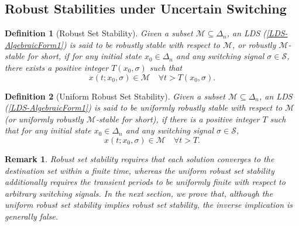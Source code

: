 \documentclass[11pt,onecolumn]{article}
\newtheorem{remark}{Remark}
\newtheorem{definition}{Definition}
\begin{document}
\subsection{Robust Stabilities under Uncertain Switching}





\begin{definition}[Robust Set Stability]\label{Definition3}
   Given a subset $\mathcal M\subseteq\Delta_{n}$, an LDS (\ref{LDS-AlgebraicForm1}) is said to be robustly stable with respect to $\mathcal M$, or robustly $\mathcal M$-stable for short, if for any initial state $x_0\in\Delta_n$ and any switching signal $\sigma\in\mathcal S$, there exists a positive integer $T(x_0,\sigma)$ such that
   \[x(t;x_0,\sigma)\in\mathcal M\quad\forall t> T(x_0,\sigma).\]

   \end{definition}

   \begin{definition}[Uniform Robust Set Stability]\label{DefinitionURSS}
   Given a subset $\mathcal M\subseteq\Delta_n$, an LDS (\ref{LDS-AlgebraicForm1}) is said to be uniformly robustly stable with respect to $\mathcal M$ (or uniformly robustly $\mathcal M$-stable for short), if there is a positive integer $T$ such that for any initial state $ x_0\in\Delta_n$ and any switching signal $\sigma\in\mathcal S$,
   \[x(t;x_0,\sigma)\in\mathcal M\quad\forall t> T.\]
   \end{definition}

   \begin{remark} Robust set stability requires that each solution converges to the destination set within a finite time, whereas the uniform robust set stability additionally requires the transient periods to be uniformly finite with respect to arbitrary switching signals. In the next section, we prove that, although the uniform robust set stability implies robust set stability, the inverse implication is generally false.
   \end{remark}






\end{document}
